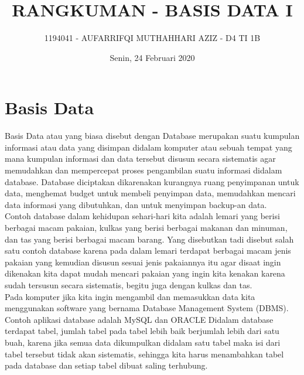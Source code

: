 \documentclass{article}
\title{RANGKUMAN - BASIS DATA I}
\author{1194041 - AUFARRIFQI MUTHAHHARI AZIZ - D4 TI 1B }
\date{Senin, 24 Februari 2020}
\begin{document}
\maketitle

\section{Basis Data}
Basis Data atau yang biasa disebut dengan Database merupakan suatu kumpulan informasi atau data yang disimpan didalam komputer atau sebuah tempat yang mana kumpulan informasi dan data tersebut disusun secara sistematis agar memudahkan dan mempercepat proses pengambilan suatu informasi didalam database. Database diciptakan dikarenakan kurangnya ruang penyimpanan untuk data, menghemat budget untuk membeli penyimpan data, memudahkan mencari data informasi yang dibutuhkan, dan untuk menyimpan backup-an data. \\

Contoh database dalam kehidupan sehari-hari kita adalah lemari yang berisi berbagai macam pakaian, kulkas yang berisi berbagai makanan dan minuman, dan tas yang berisi berbagai macam barang. Yang disebutkan tadi disebut salah satu contoh database karena pada dalam lemari terdapat berbagai macam jenis pakaian yang kemudian disusun sesuai jenis pakaiannya itu agar disaat ingin dikenakan kita dapat mudah mencari pakaian yang ingin kita kenakan karena sudah tersusun secara sistematis, begitu juga dengan kulkas dan tas. \\

Pada komputer jika kita ingin mengambil dan memasukkan data kita menggunakan software yang bernama Database Management System (DBMS). Contoh aplikasi database adalah MySQL dan ORACLE Didalam database terdapat tabel, jumlah tabel pada tabel lebih baik berjumlah lebih dari satu buah, karena jika semua data dikumpulkan didalam satu tabel maka isi dari tabel tersebut tidak akan sistematis, sehingga kita harus menambahkan tabel pada database dan setiap tabel dibuat saling terhubung.\\
\end{document}
